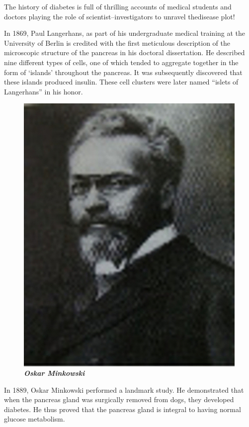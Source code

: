 The history of diabetes is full of thrilling accounts of medical students and doctors playing the role of scientist–investigators to unravel the\break disease plot!

In 1869, Paul Langerhans, as part of his undergraduate medical\- training at the University of Berlin is credited with the first meticulous description of the microscopic structure of the pancreas in his doctoral dissertation. He described nine different types of cells, one of which tended to aggregate together in the form of ‘islands’ throughout the pancreas. It was subsequently discovered that these islands produced insulin. These cell clusters were later named “islets of Langerhans” in his honor.

\begin{figure}
\centering
\includegraphics[scale=.6]{images/009.jpg}\\
\textbf{\textit{Oskar Minkowski}}
\end{figure}

In 1889, Oskar Minkowski performed a landmark study. He demonstrated that when the pancreas gland was surgically removed from dogs, they developed diabetes. He thus proved that the pancreas gland is integral to having normal glucose metabolism.

